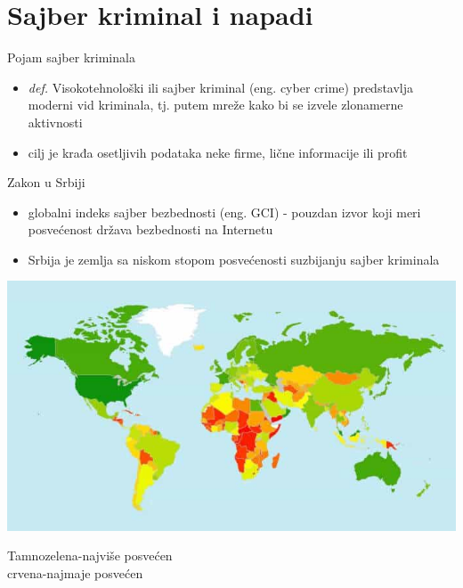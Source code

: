 \section{Sajber kriminal i napadi}

\begin{frame}{Pojam sajber kriminala}
        
        \begin{itemize}
        	\item \textit{def.} Visokotehnološki ili sajber kriminal (eng. cyber crime) predstavlja moderni vid kriminala, tj. putem mreže kako bi se izvele zlonamerne aktivnosti
            
			\item cilj je krađa osetljivih podataka neke firme, lične informacije ili profit
            
        \end{itemize}
    \end{frame}
    
    
   \begin{frame}{Zakon u Srbiji}
    \begin{itemize}
    \item globalni indeks sajber bezbednosti (eng. GCI) - pouzdan izvor koji meri posvećenost država bezbednosti na Internetu 
    \item Srbija je zemlja sa niskom stopom posvećenosti suzbijanju sajber kriminala
    \end{itemize}
	\begin{minipage}{0.3\textwidth}
        \includegraphics[scale = 0.25]{itu_worldmap.jpg}
        \end{minipage}
        \begin{minipage}{0.6\textwidth}\raggedleft
        Tamnozelena-najviše posvećen\\
        crvena-najmaje posvećen\\
        \end{minipage}
    \end{frame}
    

